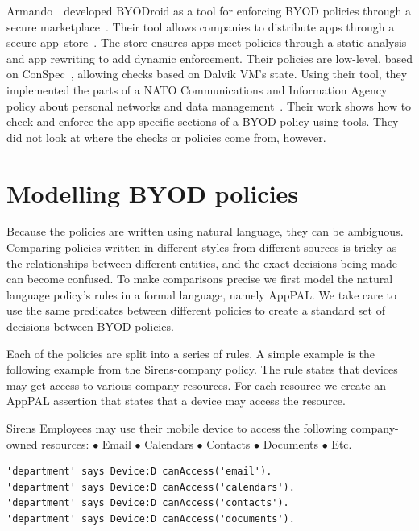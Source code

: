\documentclass[thesis.tex]{subfiles}
\begin{document}
Armando~\etal~developed BYODroid as a tool for enforcing BYOD policies through a
secure marketplace~\cite{armando_bring_2013}. Their tool allows companies to
distribute apps through a secure app~store~\cite{armando_enabling_2014}. The
store ensures apps meet policies through a static analysis and
app rewriting to add dynamic enforcement. Their policies are low-level, based on
ConSpec~\cite{aktug_conspec_2008}, allowing checks based on Dalvik VM's state.
Using their tool, they implemented the parts of a NATO Communications and
Information Agency policy about personal networks and data
management~\cite{armando_developing_2016}. Their work shows how to check and enforce the app-specific
sections of a BYOD policy using tools. They did not
look at where the checks or policies come from, however.


\section{Modelling BYOD policies}

Because the policies are written using natural language, they can be ambiguous.
Comparing policies written in different styles from different sources is tricky
as the relationships between different entities, and the exact decisions being
made can become confused. To make comparisons precise we first model the
natural language policy's rules in a formal language, namely AppPAL. We take
care to use the same predicates between different policies to create a standard
set of decisions between \ac{BYOD} policies.

Each of the policies are split into a series of rules. A simple example is the
following example from the Sirens-company policy. The rule states that devices
may get access to various company resources.
For each resource we create an AppPAL
assertion that states that a device may access the resource.

\begin{policyrule}{Sirens}
  Employees may use their mobile device to access the following company-owned resources:
  \newline $\bullet$ Email $\bullet$ Calendars $\bullet$ Contacts $\bullet$ Documents $\bullet$ Etc.
  \normalfont
  \begin{lstlisting}
'department' says Device:D canAccess('email').
'department' says Device:D canAccess('calendars').
'department' says Device:D canAccess('contacts').
'department' says Device:D canAccess('documents').
  \end{lstlisting}
\end{policyrule}
\end{document}
